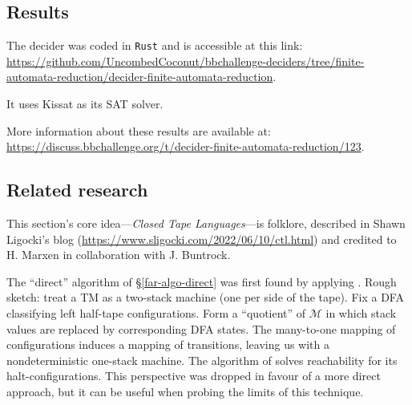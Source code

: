 \subsection{Results}
The decider was coded in \texttt{Rust} and is accessible at this link: \url{https://github.com/UncombedCoconut/bbchallenge-deciders/tree/finite-automata-reduction/decider-finite-automata-reduction}.

It uses Kissat\cite{Biere_2020} as its \textsc{SAT} solver.

More information about these results are available at: \url{https://discuss.bbchallenge.org/t/decider-finite-automata-reduction/123}.

\subsection{Related research}
This section's core idea---\emph{Closed Tape Languages}---is folklore, described in Shawn Ligocki's blog (\url{https://www.sligocki.com/2022/06/10/ctl.html}) and credited to H. Marxen in collaboration with J. Buntrock.

The ``direct'' algorithm of \S \ref{far-algo-direct} was first found by applying \cite{BEM_1997}.
Rough sketch: treat a TM as a two-stack machine (one per side of the tape).
Fix a DFA classifying left half-tape configurations.
Form a ``quotient'' of $\mathcal{M}$ in which stack values are replaced by corresponding DFA states.
The many-to-one mapping of configurations induces a mapping of transitions, leaving us with a nondeterministic one-stack machine.
The algorithm of \cite{BEM_1997} solves reachability for its halt-configurations.
This perspective was dropped in favour of a more direct approach, but it can be useful when probing the limits of this technique.
